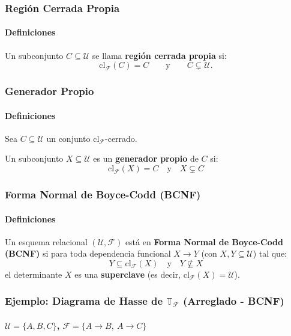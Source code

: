 \documentclass[aspectratio=169,12pt]{beamer}
\begin{document}
\begin{frame}
    \frametitle{Región Cerrada Propia}
    \framesubtitle{Definiciones}
        Un subconjunto $C \subseteq \mathcal{U}$ se llama \textbf{región cerrada propia} si:
        \[ \mathrm{cl}_{\mathcal{F}}(C) = C \qquad \text{y} \qquad C \subsetneq \mathcal{U}. \]
\end{frame}

\begin{frame}
    \frametitle{Generador Propio}
    \framesubtitle{Definiciones}

    Sea $C \subseteq \mathcal{U}$ un conjunto $\mathrm{cl}_{\mathcal{F}}$-cerrado. 
    
    \vspace{0.4cm}
    
    Un subconjunto $X \subseteq \mathcal{U}$ es un \textbf{generador propio} de $C$ si:
    \[ \mathrm{cl}_{\mathcal{F}}(X) = C \quad \text{y} \quad X \subsetneq C \]

\end{frame}

\begin{frame}
    \frametitle{Forma Normal de Boyce-Codd (BCNF)}
    \framesubtitle{Definiciones}

    Un esquema relacional $(\mathcal{U}, \mathcal{F})$ está en \textbf{Forma Normal de Boyce-Codd (BCNF)} si para toda dependencia funcional $X \rightarrow Y$ (con $X, Y \subseteq \mathcal{U}$) tal que:
    \[ Y \subseteq \mathrm{cl}_{\mathcal{F}}(X) \quad \text{y} \quad Y \not\subseteq X \]
    el determinante $X$ es una \textbf{superclave} (es decir, $\mathrm{cl}_{\mathcal{F}}(X) = \mathcal{U}$).
\end{frame} 

\begin{frame}
    \frametitle{Ejemplo: Diagrama de Hasse de $\mathbb{T}_{\mathcal{F}}$ (Arreglado - BCNF)}
    \framesubtitle{$\mathcal{U} = \{A,B,C\}$, \quad $\mathcal{F} = \{A \rightarrow B,\ A \rightarrow C\}$}

    \centering
    \vspace{0.3cm}
\end{frame}
\end{document}
